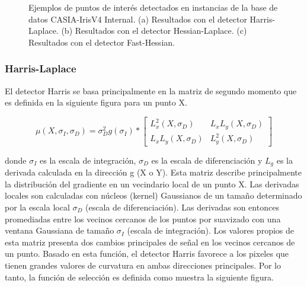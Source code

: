 \begin{figure}[htbp]
\centering
{}
\caption{Ejemplos de puntos de interés detectados en instancias de la base de datos CASIA-IrisV4 Internal. (a) Resultados con el detector Harris-Laplace.   (b) Resultados con el detector Hessian-Laplace. (c) Resultados con el detector Fast-Hessian.} \label{fig:señales}
\end{figure}


\subsubsection{Harris-Laplace}

El detector Harris \cite{Reference24} se basa principalmente en la matriz de segundo momento que es definida en la siguiente figura para un punto X.

\[
\mu (X, \sigma_{I}, \sigma_{D}) = \sigma_{D}^{2} g(\sigma_{I}) * \begin{bmatrix}
 L_{x}^{2}(X, \sigma_{D}) &  L_{x} L_{y}(X, \sigma_{D}) \\ 
  L_{x} L_{y}(X, \sigma_{D}) & L_{y}^{2}(X, \sigma_{D})
\end{bmatrix}
\]

donde $\sigma_{I}$ es la escala de integración, $\sigma_{D}$ es la escala de diferenciación y $ L_{g}$ es la derivada calculada en la dirección g (X o Y). Esta matriz describe principalmente la distribución del gradiente en un vecindario local de un punto X. Las derivadas locales son calculadas con núcleos (kernel) Gaussianos de un tamaño determinado por la escala local $\sigma_{D}$ (escala de diferenciación). Las derivadas son entonces promediadas entre los vecinos cercanos de los puntos por suavizado con una ventana Gaussiana de tamaño $\sigma_{I}$ (escala de integración). Los valores propios de esta matriz presenta dos cambios principales de señal en los vecinos cercanos de un punto. Basado en esta función, el detector Harris favorece a los pixeles que tienen grandes valores de curvatura en ambas direcciones principales. Por lo tanto, la función de selección es definida como muestra la siguiente figura. 

